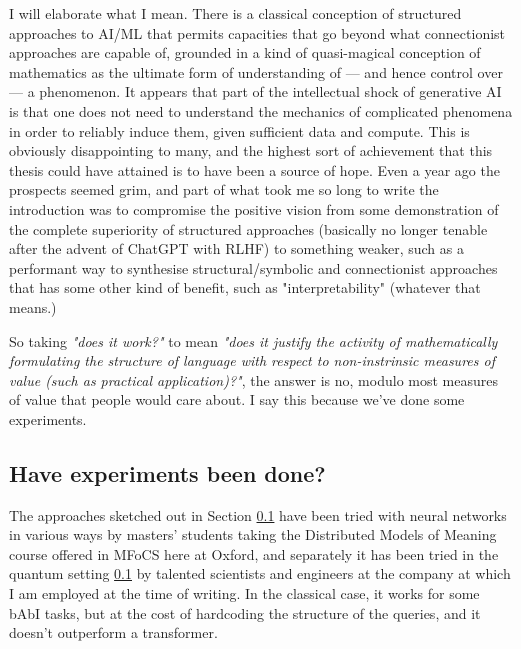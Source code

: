 I will elaborate what I mean. There is a classical conception of structured approaches to AI/ML that permits capacities that go beyond what connectionist approaches are capable of, grounded in a kind of quasi-magical conception of mathematics as the ultimate form of understanding of --- and hence control over --- a phenomenon. It appears that part of the intellectual shock of generative AI is that one does not need to understand the mechanics of complicated phenomena in order to reliably induce them, given sufficient data and compute. This is obviously disappointing to many, and the highest sort of achievement that this thesis could have attained is to have been a source of hope. Even a year ago the prospects seemed grim, and part of what took me so long to write the introduction was to compromise the positive vision from some demonstration of the complete superiority of structured approaches (basically no longer tenable after the advent of ChatGPT with RLHF) to something weaker, such as a performant way to synthesise structural/symbolic and connectionist approaches that has some other kind of benefit, such as "interpretability" (whatever that means.)

So taking \emph{"does it work?"} to mean \emph{"does it justify the activity of mathematically formulating the structure of language with respect to non-instrinsic measures of value (such as practical application)?"}, the answer is no, modulo most measures of value that people would care about. I say this because we've done some experiments.

\subsection{Have experiments been done?}

The approaches sketched out in Section \ref{} have been tried with neural networks in various ways by masters' students taking the Distributed Models of Meaning course offered in MFoCS here at Oxford, and separately it has been tried in the quantum setting \ref{} by talented scientists and engineers at the company at which I am employed at the time of writing. In the classical case, it works for some bAbI tasks, but at the cost of hardcoding the structure of the queries, and it doesn't outperform a transformer.

